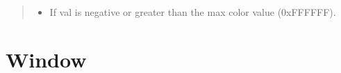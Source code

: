 \documentclass[letterpaper,10pt,english,openany,oneside]{sphinxmanual}
\begin{document}
\begin{fulllineitems}
\begin{fulllineitems}
\begin{quote}
\begin{description}
\begin{itemize}
\item {} 
\sphinxAtStartPar
{} \textendash{} If val is negative or greater than the max color
    value (0xFFFFFF).

\end{itemize}

\end{description}\end{quote}

\end{fulllineitems}


\end{fulllineitems}



\section{Window}
\label{\detokenize{dpav:window}}
\end{document}
